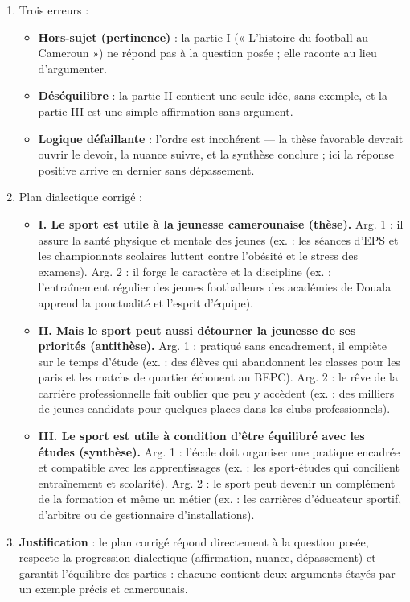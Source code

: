 \documentclass[11pt]{article}
\begin{document}
\begin{corrige}
\begin{enumerate}
\item Trois erreurs :
\begin{itemize}
\item \textbf{Hors-sujet (pertinence)} : la partie I (« L'histoire du football au Cameroun ») ne répond pas à la question posée ; elle raconte au lieu d'argumenter.
\item \textbf{Déséquilibre} : la partie II contient une seule idée, sans exemple, et la partie III est une simple affirmation sans argument.
\item \textbf{Logique défaillante} : l'ordre est incohérent — la thèse favorable devrait ouvrir le devoir, la nuance suivre, et la synthèse conclure ; ici la réponse positive arrive en dernier sans dépassement.
\end{itemize}
\item Plan dialectique corrigé :
\begin{itemize}
\item \textbf{I. Le sport est utile à la jeunesse camerounaise (thèse).} Arg. 1 : il assure la santé physique et mentale des jeunes (ex. : les séances d'EPS et les championnats scolaires luttent contre l'obésité et le stress des examens). Arg. 2 : il forge le caractère et la discipline (ex. : l'entraînement régulier des jeunes footballeurs des académies de Douala apprend la ponctualité et l'esprit d'équipe).
\item \textbf{II. Mais le sport peut aussi détourner la jeunesse de ses priorités (antithèse).} Arg. 1 : pratiqué sans encadrement, il empiète sur le temps d'étude (ex. : des élèves qui abandonnent les classes pour les paris et les matchs de quartier échouent au BEPC). Arg. 2 : le rêve de la carrière professionnelle fait oublier que peu y accèdent (ex. : des milliers de jeunes candidats pour quelques places dans les clubs professionnels).
\item \textbf{III. Le sport est utile à condition d'être équilibré avec les études (synthèse).} Arg. 1 : l'école doit organiser une pratique encadrée et compatible avec les apprentissages (ex. : les sport-études qui concilient entraînement et scolarité). Arg. 2 : le sport peut devenir un complément de la formation et même un métier (ex. : les carrières d'éducateur sportif, d'arbitre ou de gestionnaire d'installations).
\end{itemize}
\item \textbf{Justification} : le plan corrigé répond directement à la question posée, respecte la progression dialectique (affirmation, nuance, dépassement) et garantit l'équilibre des parties : chacune contient deux arguments étayés par un exemple précis et camerounais.
\end{enumerate}
\end{corrige}
\end{document}
